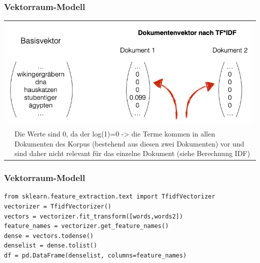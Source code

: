     
\begin{frame}
    \frametitle{Vektorraum-Modell}
    \vspace{.5cm}
    
    \begin{table}[htp]
    \begin{center}
    \begin{tabular}{p{3cm}p{7cm}}
    \multicolumn{2}{c}{\includegraphics[width=\linewidth]{fig8/tfidfvektor}}\\
     & \tiny{Die Werte sind 0, da der log(1)=0 -> die Terme kommen in allen Dokumenten des Korpus (bestehend aus diesen zwei Dokumenten) vor und sind daher nicht relevant für das einzelne Dokument (siehe Berechnung IDF)}\\
    \end{tabular}
    \end{center}
    \end{table}
    
\end{frame}
    
    
\begin{frame}[fragile]
\frametitle{Vektorraum-Modell}
    
    \begin{verbatim}
from sklearn.feature_extraction.text import TfidfVectorizer
vectorizer = TfidfVectorizer()
vectors = vectorizer.fit_transform([words,words2])
feature_names = vectorizer.get_feature_names()
dense = vectors.todense()
denselist = dense.tolist()
df = pd.DataFrame(denselist, columns=feature_names)
    \end{verbatim}
\end{frame}
     
    
